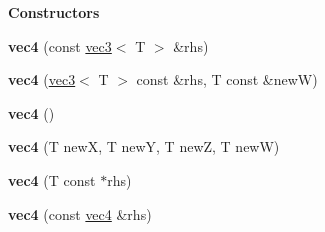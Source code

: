 \begin{Indent}{\bf Constructors}\par
{\em \label{_amgrp559a25fdb98a7d1fd1c3771ac568d5e9}
 }\begin{DoxyCompactItemize}
\item 
\hypertarget{classmath_1_1vec4_a8a5e9324ce00792995883c2b1668ba3a}{
{\bfseries vec4} (const \hyperlink{classmath_1_1vec3}{vec3}$<$ T $>$ \&rhs)}
\label{classmath_1_1vec4_a8a5e9324ce00792995883c2b1668ba3a}

\item 
\hypertarget{classmath_1_1vec4_a1854eb9c26e3451471ccc5f204e05f94}{
{\bfseries vec4} (\hyperlink{classmath_1_1vec3}{vec3}$<$ T $>$ const \&rhs, T const \&newW)}
\label{classmath_1_1vec4_a1854eb9c26e3451471ccc5f204e05f94}

\item 
\hypertarget{classmath_1_1vec4_acd70cfec2ef8ac46c9756b4044beecaa}{
{\bfseries vec4} ()}
\label{classmath_1_1vec4_acd70cfec2ef8ac46c9756b4044beecaa}

\item 
\hypertarget{classmath_1_1vec4_aa5fcadd0ce581569e82ee0b14e7a4cc0}{
{\bfseries vec4} (T newX, T newY, T newZ, T newW)}
\label{classmath_1_1vec4_aa5fcadd0ce581569e82ee0b14e7a4cc0}

\item 
\hypertarget{classmath_1_1vec4_ab970028d7608787f3e6ca0eb6ce14669}{
{\bfseries vec4} (T const $\ast$rhs)}
\label{classmath_1_1vec4_ab970028d7608787f3e6ca0eb6ce14669}

\item 
\hypertarget{classmath_1_1vec4_a0e5fa5f584295fe1b6bb66ebcbcb01e9}{
{\bfseries vec4} (const \hyperlink{classmath_1_1vec4}{vec4} \&rhs)}
\label{classmath_1_1vec4_a0e5fa5f584295fe1b6bb66ebcbcb01e9}

\end{DoxyCompactItemize}
\end{Indent}
